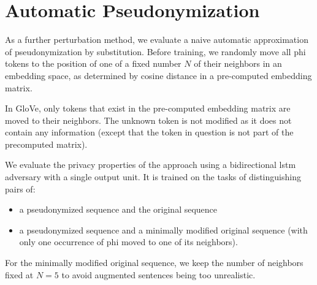 
\section{Automatic Pseudonymization}\label{sec:automatic-pseudonymization}
%
As a further perturbation method, we evaluate a naive automatic approximation of pseudonymization by substitution.
%
Before training, we randomly move all \ac{phi} tokens to the position of one of a fixed number $N$ of their neighbors in an embedding space, as determined by cosine distance in a pre-computed embedding matrix.

%
In GloVe, only tokens that exist in the pre-computed embedding matrix are moved to their neighbors.
%
The unknown token is not modified as it does not contain any information (except that the token in question is not part of the precomputed matrix).

%
We evaluate the privacy properties of the approach using a bidirectional \ac{lstm} adversary with a single output unit.
%
It is trained on the tasks of distinguishing pairs of:
\begin{itemize}
    \item a pseudonymized sequence and the original sequence
    \item a pseudonymized sequence and a minimally modified original sequence (with only one occurrence of \ac{phi} moved to one of its neighbors).
\end{itemize}
%
For the minimally modified original sequence, we keep the number of neighbors fixed at $N=5$ to avoid augmented sentences being too unrealistic.

